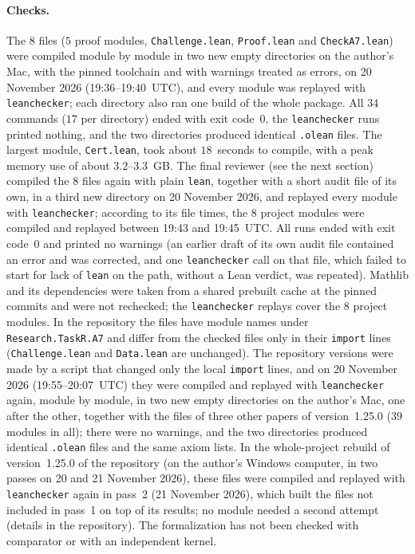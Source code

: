 \documentclass[11pt]{article}
\theoremstyle{definition}
\theoremstyle{remark}
\newcommand{\repoversion}{1.25.0}
\begin{document}
{\paragraph{Checks.}
The $8$ files ($5$ proof modules, \texttt{Challenge.lean},
\texttt{Proof.lean} and \texttt{CheckA7.lean}) were compiled module by module
in two new empty directories on the author's Mac, with the pinned toolchain
and with warnings treated as errors, on 20 November 2026
(19:36--19:40~UTC), and every module was replayed with \texttt{leanchecker};
each directory also ran one build of the whole package. All $34$ commands
($17$ per directory) ended with exit code~$0$, the \texttt{leanchecker} runs
printed nothing, and the two directories produced identical \texttt{.olean}
files. The largest module, \texttt{Cert.lean}, took about $18$~seconds to
compile, with a peak memory use of about $3.2$--$3.3$~GB. The final reviewer (see the
next section) compiled the $8$ files again with plain \texttt{lean}, together
with a short audit file of its own, in a third new directory on 20 November
2026, and replayed every module with \texttt{leanchecker}; according to its
file times, the $8$ project modules were compiled and replayed between 19:43
and 19:45~UTC. All runs ended with exit code~$0$ and printed no warnings (an
earlier draft of its own audit file contained an error and was corrected, and
one \texttt{leanchecker} call on that file, which failed to start for lack of
\texttt{lean} on the path, without a Lean verdict, was repeated). Mathlib and
its dependencies were taken from a shared prebuilt cache at the pinned commits
and were not rechecked; the \texttt{leanchecker} replays cover the $8$ project
modules. In the repository the files have module names under
\texttt{Research.TaskR.A7} and differ from the checked files only in their
\texttt{import} lines (\texttt{Challenge.lean} and \texttt{Data.lean} are
unchanged). The repository versions were made by a script that changed only the local \texttt{import} lines, and on 20 November 2026 (19:55--20:07~UTC) they were compiled and replayed with \texttt{leanchecker} again, module by module, in two new empty directories on the author's Mac, one after the other, together with the files of three other papers of version~\repoversion{} ($39$ modules in all); there were no warnings, and the two directories produced identical \texttt{.olean} files and the same axiom lists. In the whole-project rebuild of version~\repoversion{} of the repository (on the author's Windows computer, in two passes on 20 and 21 November 2026), these files were compiled and replayed with \texttt{leanchecker} again in pass~2 (21 November 2026), which built the files not included in pass~1 on top of its results; no module needed a second attempt (details in the repository). The formalization has not been
checked with comparator or with an independent kernel.

\par}
\end{document}
